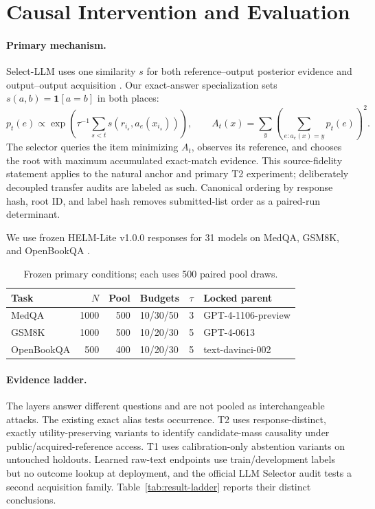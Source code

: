 \section{Causal Intervention and Evaluation}
\label{sec:protocol}

\paragraph{Primary mechanism.}
Select-LLM uses one similarity $s$ for both reference--output posterior evidence and output--output acquisition \citep{durmazkeser2026selectllm}. Our exact-answer specialization sets $s(a,b)=\mathbf 1[a=b]$ in both places:
\[
p_t(e)\propto\exp\!\left(\tau^{-1}\!\sum_{s<t}s(r_{i_s},a_e(x_{i_s}))\right),\qquad
A_t(x)=\sum_y\left(\sum_{e:a_e(x)=y}p_t(e)\right)^2.
\]
The selector queries the item minimizing $A_t$, observes its reference, and chooses the root with maximum accumulated exact-match evidence. This source-fidelity statement applies to the natural anchor and primary T2 experiment; deliberately decoupled transfer audits are labeled as such. Canonical ordering by response hash, root ID, and label hash removes submitted-list order as a paired-run determinant.

We use frozen HELM-Lite v1.0.0 responses for 31 models \citep{liang2023helm} on MedQA, GSM8K, and OpenBookQA \citep{jin2021medqa,cobbe2021gsm8k,mihaylov2018openbookqa}.

\begin{table}[H]
\centering
\caption{Frozen primary conditions; each uses 500 paired pool draws.}
\label{tab:protocol}
\scriptsize
\setlength{\tabcolsep}{3.5pt}
\begin{tabularx}{\linewidth}{@{}l r r l c >{\raggedright\arraybackslash}X@{}}
\toprule
Task & $N$ & Pool & Budgets & $\tau$ & Locked parent \\
\midrule
MedQA & 1000 & 500 & 10/30/50 & 3 & GPT-4-1106-preview \\
GSM8K & 1000 & 500 & 10/20/30 & 5 & GPT-4-0613 \\
OpenBookQA & 500 & 400 & 10/20/30 & 5 & text-davinci-002 \\
\bottomrule
\end{tabularx}
\end{table}

\paragraph{Evidence ladder.}
The layers answer different questions and are not pooled as interchangeable attacks. The existing exact alias tests occurrence. T2 uses response-distinct, exactly utility-preserving variants to identify candidate-mass causality under public/acquired-reference access. T1 uses calibration-only abstention variants on untouched holdouts. Learned raw-text endpoints use train/development labels but no outcome lookup at deployment, and the official LLM Selector audit tests a second acquisition family. Table~\ref{tab:result-ladder} reports their distinct conclusions.

